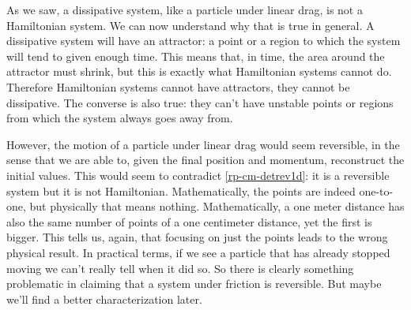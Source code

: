 As we saw, a dissipative system, like a particle under linear drag, is not a Hamiltonian system. We can now understand why that is true in general. A dissipative system will have an attractor: a point or a region to which the system will tend to given enough time. This means that, in time, the area around the attractor must shrink, but this is exactly what Hamiltonian systems cannot do. Therefore Hamiltonian systems cannot have attractors, they cannot be dissipative. The converse is also true: they can't have unstable points or regions from which the system always goes away from.

However, the motion of a particle under linear drag would seem reversible, in the sense that we are able to, given the final position and momentum, reconstruct the initial values. This would seem to contradict \ref{rp-cm-detrev1d}: it is a reversible system but it is not Hamiltonian. Mathematically, the points are indeed one-to-one, but physically that means nothing. Mathematically, a one meter distance has also the same number of points of a one centimeter distance, yet the first is bigger. This tells us, again, that focusing on just the points leads to the wrong physical result. In practical terms, if we see a particle that has already stopped moving we can't really tell when it did so. So there is clearly something problematic in claiming that a system under friction is reversible. But maybe we'll find a better characterization later.





